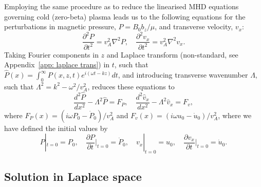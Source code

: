 \documentclass{aastex61}
\begin{document}
Employing the same procedure as \cite{rud_etal06} to reduce the linearised MHD equations governing cold (zero-beta) plasma leads us to the following equations for the perturbations in magnetic pressure, $P = B_0b_z/\mu$, and transverse velocity, $v_x$:
\begin{equation}
\frac{\partial^2P}{\partial{}t^2} = v_A^2 \nabla^2P, \quad \frac{\partial^2v_x}{\partial{}t^2} = v_A^2 \nabla^2v_x.
\end{equation}
Taking Fourier components in $z$ and Laplace transform (non-standard, see Appendix~\ref{app: laplace trans}) in $t$, such that $\hat{P}(x) = \int_0^\infty P(x,z,t)e^{i(\omega{}t-kz)} dt$, and introducing transverse wavenumber $\Lambda$, such that $\Lambda^2 = k^2 - \omega^2 / v_A^2$, reduces these equations to
\begin{equation}
\frac{d^2\hat{P}}{dx^2} - \Lambda^2 \hat{P} = F_P, \quad \frac{d^2\hat{v}_x}{dx^2} - \Lambda^2 \hat{v}_x = F_v,
\end{equation}
where $F_P(x) = (i\omega P_0 - \dot{P}_0) / v_A^2$ and $F_v(x) = (i\omega u_0 - \dot{u}_0) / v_A^2$, where we have defined the initial values by
\begin{equation}
P|_{t=0} = P_0, \quad \frac{\partial{}P}{\partial{t}}\biggr\rvert_{t=0} = \dot{P}_0, \quad v_x|_{t=0} = u_0, \quad \frac{\partial{}v_x}{\partial{t}}\biggr\rvert_{t=0} = \dot{u}_0.
\end{equation}

\subsection{Solution in Laplace space}
\end{document}
